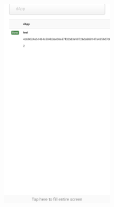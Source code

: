 \begin{figure}[h!]
	\centering
	\includegraphics[width=0.5\textwidth]{images/android-app-screenshot.jpg}
	\caption{\label{fig:android-app}}
\end{figure}
